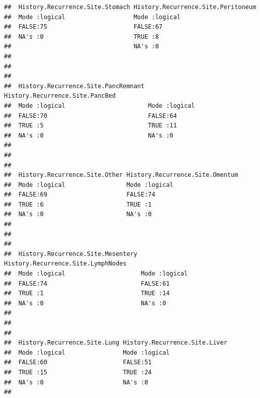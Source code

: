 \documentclass{article}\usepackage[]{graphicx}\usepackage[]{color}
\makeatletter
\newenvironment{kframe}{%
 \def\at@end@of@kframe{}%
 \ifinner\ifhmode%
  \def\at@end@of@kframe{\end{minipage}}%
  \begin{minipage}{\columnwidth}%
 \fi\fi%
 \def\FrameCommand##1{\hskip\@totalleftmargin \hskip-\fboxsep
 \colorbox{shadecolor}{##1}\hskip-\fboxsep
     \hskip-\linewidth \hskip-\@totalleftmargin \hskip\columnwidth}%
 \MakeFramed {\advance\hsize-\width
   \@totalleftmargin\z@ \linewidth\hsize
   \@setminipage}}%
 {\par\unskip\endMakeFramed%
 \at@end@of@kframe}
\newenvironment{knitrout}{}{} %
\makeatother
\begin{document}
\begin{knitrout}
\begin{kframe}
\begin{verbatim}
##  History.Recurrence.Site.Stomach History.Recurrence.Site.Peritoneum
##  Mode :logical                   Mode :logical                     
##  FALSE:75                        FALSE:67                          
##  NA's :0                         TRUE :8                           
##                                  NA's :0                           
##                                                                    
##                                                                    
##                                                                    
##  History.Recurrence.Site.PancRemnant History.Recurrence.Site.PancBed
##  Mode :logical                       Mode :logical                  
##  FALSE:70                            FALSE:64                       
##  TRUE :5                             TRUE :11                       
##  NA's :0                             NA's :0                        
##                                                                     
##                                                                     
##                                                                     
##  History.Recurrence.Site.Other History.Recurrence.Site.Omentum
##  Mode :logical                 Mode :logical                  
##  FALSE:69                      FALSE:74                       
##  TRUE :6                       TRUE :1                        
##  NA's :0                       NA's :0                        
##                                                               
##                                                               
##                                                               
##  History.Recurrence.Site.Mesentery History.Recurrence.Site.LymphNodes
##  Mode :logical                     Mode :logical                     
##  FALSE:74                          FALSE:61                          
##  TRUE :1                           TRUE :14                          
##  NA's :0                           NA's :0                           
##                                                                      
##                                                                      
##                                                                      
##  History.Recurrence.Site.Lung History.Recurrence.Site.Liver
##  Mode :logical                Mode :logical                
##  FALSE:60                     FALSE:51                     
##  TRUE :15                     TRUE :24                     
##  NA's :0                      NA's :0                      
##                                                            

\end{verbatim}
\end{kframe}
\end{knitrout}
\end{document}
